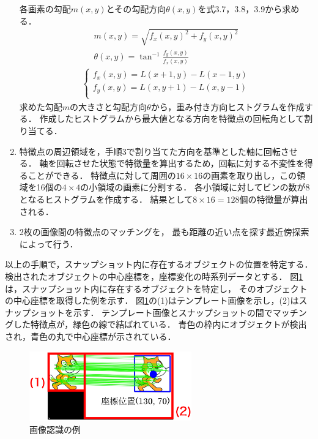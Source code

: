 \documentclass[11pt]{jreport}
\begin{document}
\begin{enumerate}
    各画素の勾配$m(x,y)$とその勾配方向$\theta(x,y)$を式3.7，3.8，3.9から求める．
    \begin{eqnarray}
        m(x,y) = \sqrt{f_x(x,y)^2 + f_y(x,y)^2} \\ 
        \theta(x,y) = \tan^{-1}\frac{f_y(x,y)}{f_x(x,y)}
    \end{eqnarray}
    \begin{eqnarray}
        \begin{cases}
            {f_x(x,y) = L(x+1,y) - L(x-1,y)} \\
            {f_y(x,y) = L(x,y+1) - L(x,y-1)} \\
        \end{cases}
    \end{eqnarray}
    求めた勾配$m$の大きさと勾配方向$\theta$から，重み付き方向ヒストグラムを作成する．
    作成したヒストグラムから最大値となる方向を特徴点の回転角として割り当てる．
    \item {} 特徴点の周辺領域を，手順3で割り当てた方向を基準とした軸に回転させる．
    軸を回転させた状態で特徴量を算出するため，回転に対する不変性を得ることができる．
    特徴点に対して周囲の$16×16$の画素を取り出し，この領域を16個の$4×4$の小領域の画素に分割する．
    各小領域に対してビンの数が8となるヒストグラムを作成する．
    結果として$8×16=128$個の特徴量が算出される．
    \item {} 2枚の画像間の特徴点のマッチングを，
    最も距離の近い点を探す最近傍探索によって行う．
\end{enumerate}

以上の手順で，スナップショット内に存在するオブジェクトの位置を特定する．
検出されたオブジェクトの中心座標を，座標変化の時系列データとする．
図\ref{recognition}は，スナップショット内に存在するオブジェクトを特定し，
そのオブジェクトの中心座標を取得した例を示す．
図\ref{recognition}の(1)はテンプレート画像を示し，(2)はスナップショットを示す．
テンプレート画像とスナップショットの間でマッチングした特徴点が，緑色の線で結ばれている．
青色の枠内にオブジェクトが検出され，青色の丸で中心座標が示されている．

\begin{figure}[H]
    \centering
    \includegraphics[width=7cm]{recognition.eps}
    \caption{画像認識の例}
    \label{recognition}
\end{figure}
\end{document}
